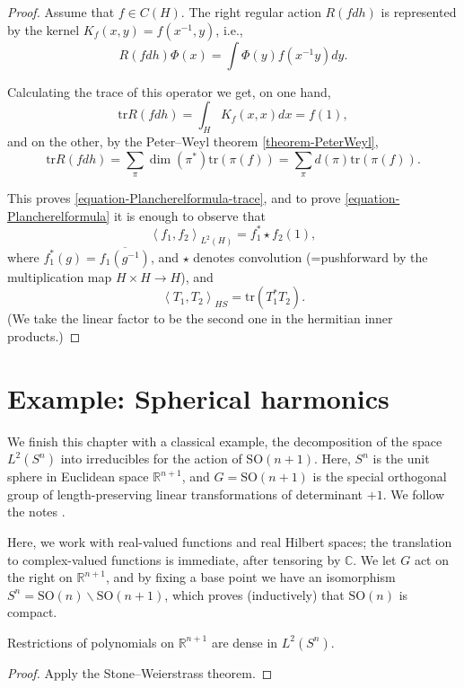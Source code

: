 \begin{proof}
 Assume that $f \in C(H)$. The right regular action $R(fdh)$ is represented by the kernel $K_f(x,y) = f(x^{-1},y)$, i.e., 
 $$ R(fdh)\Phi(x) = \int \Phi(y) f(x^{-1}y) dy.$$
 
 Calculating the trace of this operator we get, on one hand, 
 $$ \text{tr} R(fdh) = \int_{H} K_f(x,x) dx = f(1),$$
 and on the other, by the Peter--Weyl theorem \ref{theorem-PeterWeyl}, 
 $$ \text{tr} R(fdh) = \sum_\pi \dim(\pi^*) \text{tr}(\pi(f)) = \sum_\pi d(\pi) \text{tr}(\pi(f)).$$
 
 This proves \eqref{equation-Plancherelformula-trace}, and to prove \eqref{equation-Plancherelformula} it is enough to observe that 
 $$ \left< f_1, f_2 \right>_{L^2(H)} = f_1^* \star f_2 (1),$$
 where $f_1^*(g) = \overline{f_1 (g^{-1})}$, and $\star$ denotes convolution (=pushforward by the multiplication map $H\times H\to H$), and 
 $$ \left< T_1, T_2\right>_{HS} = \text{tr} (T_1^* T_2).$$
 (We take the linear factor to be the second one in the hermitian inner products.)
\end{proof}

\section{Example: Spherical harmonics}
\label{section-spherical-harmonics}

We finish this chapter with a classical example, the decomposition of the space $L^2(S^n)$ into irreducibles for the action of $\text{SO}(n+1)$. Here, $S^n$ is the unit sphere in Euclidean space $\mathbb R^{n+1}$, and $G=\text{SO}(n+1)$ is the special orthogonal group of length-preserving linear transformations of determinant $+1$. We follow the notes \cite{Gallier}.

Here, we work with real-valued functions and real Hilbert spaces; the translation to complex-valued functions is immediate, after tensoring by $\mathbb C$. We let $G$ act on the right on $\mathbb R^{n+1}$, and by fixing a base point we have an isomorphism $S^n = \text{SO}(n)\backslash \text{SO}(n+1)$, which proves (inductively) that $\text{SO}(n)$ is compact.

\begin{lemma}
 \label{lemma-polynomials-dense-onsphere}
Restrictions of polynomials on $\mathbb R^{n+1}$ are dense in $L^2(S^n)$. 
\end{lemma}

\begin{proof}
 Apply the Stone--Weierstrass theorem.
\end{proof}

